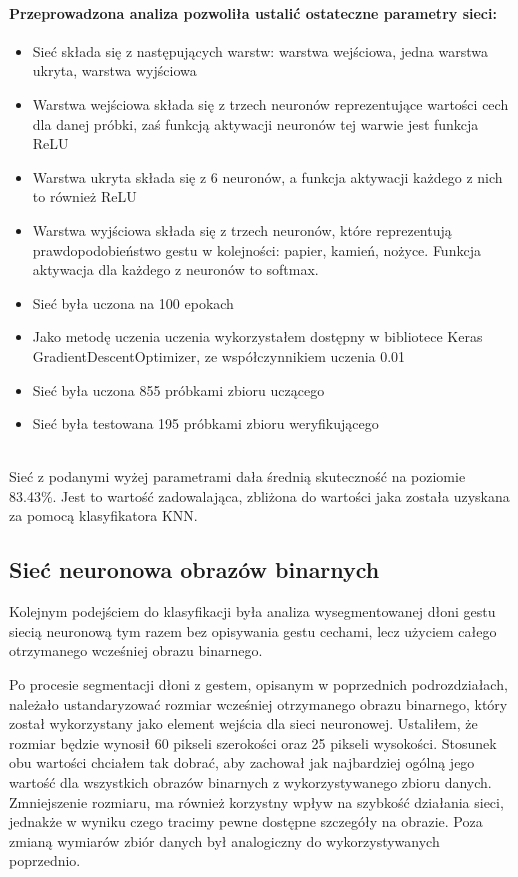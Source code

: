 \documentclass[a4paper,12pt,twoside,openany]{report}
\begin{document}
	\paragraph{Przeprowadzona analiza pozwoliła ustalić ostateczne parametry sieci:}
	\begin{itemize}
		\item Sieć składa się z następujących warstw: warstwa wejściowa, jedna warstwa ukryta, warstwa wyjściowa
		\item Warstwa wejściowa składa się z trzech neuronów reprezentujące wartości cech dla danej próbki, zaś funkcją aktywacji neuronów tej warwie jest funkcja ReLU
		\item Warstwa ukryta składa się z 6 neuronów, a funkcja aktywacji każdego z nich to również ReLU
		\item Warstwa wyjściowa składa się z trzech neuronów, które reprezentują prawdopodobieństwo gestu w kolejności: papier, kamień, nożyce. Funkcja aktywacja dla każdego z neuronów to softmax.
		\item Sieć była uczona na 100 epokach
		\item Jako metodę uczenia uczenia wykorzystałem dostępny w bibliotece Keras GradientDescentOptimizer, ze współczynnikiem uczenia 0.01
		\item Sieć była uczona 855 próbkami zbioru uczącego
		\item Sieć była testowana 195 próbkami zbioru weryfikującego
	\end{itemize}
	\mbox{}
	\\
	Sieć z podanymi wyżej parametrami dała średnią skuteczność na poziomie 83.43\%. Jest to wartość zadowalająca, zbliżona do wartości jaka została uzyskana za pomocą klasyfikatora KNN.
\subsection{Sieć neuronowa obrazów binarnych}


	Kolejnym podejściem do klasyfikacji była analiza wysegmentowanej dłoni gestu siecią neuronową tym razem bez opisywania gestu cechami, lecz użyciem całego otrzymanego wcześniej obrazu binarnego.
	
	Po procesie segmentacji dłoni z gestem, opisanym w poprzednich podrozdziałach, należało ustandaryzować rozmiar wcześniej otrzymanego obrazu binarnego, który został wykorzystany jako element wejścia dla sieci neuronowej. Ustaliłem, że rozmiar będzie wynosił 60 pikseli szerokości oraz 25 pikseli wysokości. Stosunek obu wartości chciałem tak dobrać, aby zachował jak najbardziej ogólną jego wartość dla wszystkich obrazów binarnych z wykorzystywanego zbioru danych. Zmniejszenie rozmiaru, ma również korzystny wpływ na szybkość działania sieci, jednakże w wyniku czego tracimy pewne dostępne szczegóły na obrazie. Poza zmianą wymiarów zbiór danych był analogiczny do wykorzystywanych poprzednio.
\end{document}
